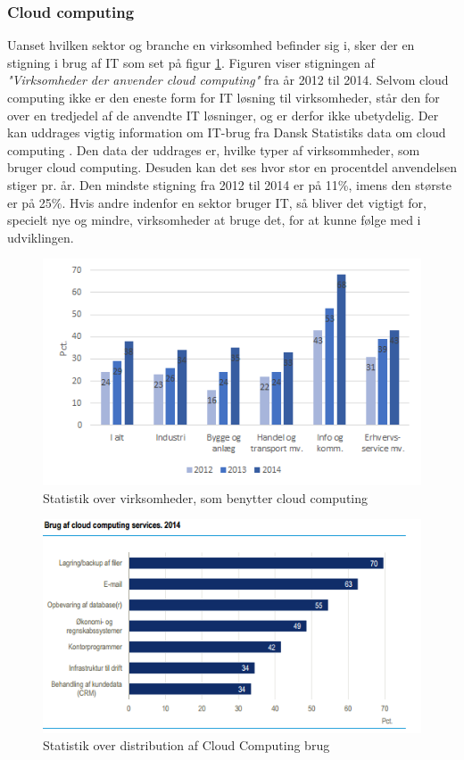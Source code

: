 \newpage
\subsubsection{Cloud computing}
Uanset hvilken sektor og branche en virksomhed befinder sig i, sker der en stigning i brug af IT som set på figur \ref{fig:virksomcc}. Figuren viser stigningen af \textit{"Virksomheder der anvender cloud computing"} fra år 2012 til 2014. Selvom cloud computing ikke er den eneste form for IT løsning til virksomheder, står den for over en tredjedel af de anvendte IT løsninger, og er derfor ikke ubetydelig. Der kan uddrages vigtig information om IT-brug fra Dansk Statistiks data om cloud computing \citep{itvirk}. Den data der uddrages er, hvilke typer af virksommheder, som bruger cloud computing. Desuden kan det ses hvor stor en procentdel anvendelsen stiger pr. år. Den mindste stigning fra 2012 til 2014 er på 11\%, imens den største er på 25\%. Hvis andre indenfor en sektor bruger IT, så bliver det vigtigt for, specielt nye og mindre, virksomheder  at bruge det, for at kunne følge med i udviklingen.  
\newpage
\begin{figure}[H]
    \centering
    \includegraphics[width=1\textwidth]{figures/CloudComputingStatestik.png}
    \caption{Statistik over virksomheder, som benytter cloud computing \citep{itvirk}} 
    \label{fig:virksomcc}
\end{figure}

\begin{figure}[H]
    \centering
    \includegraphics[width=1\textwidth]{figures/brugafccservices.png}
    \caption{Statistik over distribution af Cloud Computing brug \citep{itvirk}}
    \label{fig:distcc}
\end{figure}

